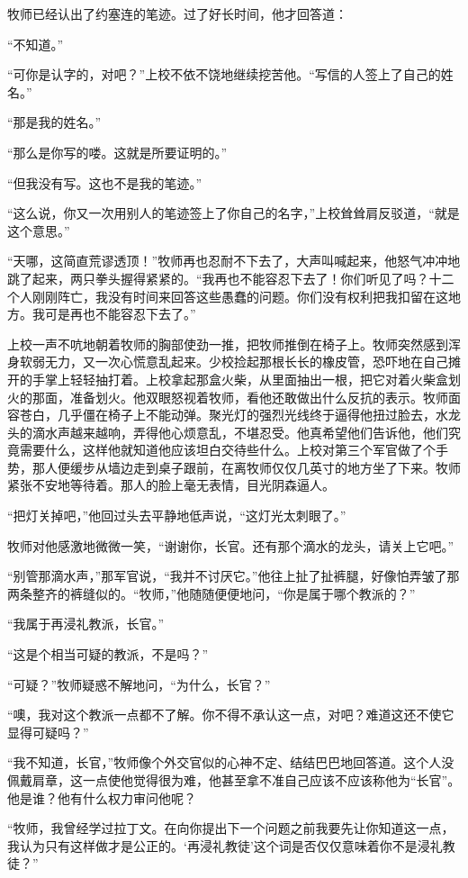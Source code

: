     牧师已经认出了约塞连的笔迹。过了好长时间，他才回答道：

    “不知道。”

    “可你是认字的，对吧？”上校不依不饶地继续挖苦他。“写信的人签上了自己的姓名。”

    “那是我的姓名。”

    “那么是你写的喽。这就是所要证明的。”

    “但我没有写。这也不是我的笔迹。”

    “这么说，你又一次用别人的笔迹签上了你自己的名字，”上校耸耸肩反驳道，“就是这个意思。”

    “天哪，这简直荒谬透顶！”牧师再也忍耐不下去了，大声叫喊起来，他怒气冲冲地跳了起来，两只拳头握得紧紧的。“我再也不能容忍下去了！你们听见了吗？十二个人刚刚阵亡，我没有时间来回答这些愚蠢的问题。你们没有权利把我扣留在这地方。我可是再也不能容忍下去了。”

    上校一声不吭地朝着牧师的胸部使劲一推，把牧师推倒在椅子上。牧师突然感到浑身软弱无力，又一次心慌意乱起来。少校捡起那根长长的橡皮管，恐吓地在自己摊开的手掌上轻轻抽打着。上校拿起那盒火柴，从里面抽出一根，把它对着火柴盒划火的那面，准备划火。他双眼怒视着牧师，看他还敢做出什么反抗的表示。牧师面容苍白，几乎僵在椅子上不能动弹。聚光灯的强烈光线终于逼得他扭过脸去，水龙头的滴水声越来越响，弄得他心烦意乱，不堪忍受。他真希望他们告诉他，他们究竟需要什么，这样他就知道他应该坦白交待些什么。上校对第三个军官做了个手势，那人便缓步从墙边走到桌子跟前，在离牧师仅仅几英寸的地方坐了下来。牧师紧张不安地等待着。那人的脸上毫无表情，目光阴森逼人。

    “把灯关掉吧，”他回过头去平静地低声说，“这灯光太刺眼了。”

    牧师对他感激地微微一笑，“谢谢你，长官。还有那个滴水的龙头，请关上它吧。”

    “别管那滴水声，”那军官说，“我并不讨厌它。”他往上扯了扯裤腿，好像怕弄皱了那两条整齐的裤缝似的。“牧师，”他随随便便地问，“你是属于哪个教派的？”

    “我属于再浸礼教派，长官。”

    “这是个相当可疑的教派，不是吗？”

    “可疑？”牧师疑惑不解地问，“为什么，长官？”

    “噢，我对这个教派一点都不了解。你不得不承认这一点，对吧？难道这还不使它显得可疑吗？”

    “我不知道，长官，”牧师像个外交官似的心神不定、结结巴巴地回答道。这个人没佩戴肩章，这一点使他觉得很为难，他甚至拿不准自己应该不应该称他为“长官”。他是谁？他有什么权力审问他呢？

    “牧师，我曾经学过拉丁文。在向你提出下一个问题之前我要先让你知道这一点，我认为只有这样做才是公正的。‘再浸礼教徒’这个词是否仅仅意味着你不是浸礼教徒？”

